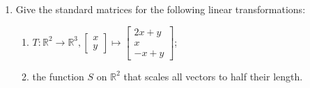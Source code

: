 \documentclass[12pt]{amsart}
\newcommand{\R}{\mathbb{R}}
\begin{document}
\begin{enumerate}
\item
 Give the standard matrices for the following linear transformations:
\begin{enumerate}
\item $T:\R^2\to\R^3, \left[\begin{matrix} x \\ y \end{matrix}\right]\mapsto \left[\begin{matrix} 2x+y \\ x \\ -x+y \end{matrix}\right]$;
\item the function $S$ on $\R^2$ that scales all vectors to half their length.

\end{enumerate}

\end{enumerate}
\end{document}
